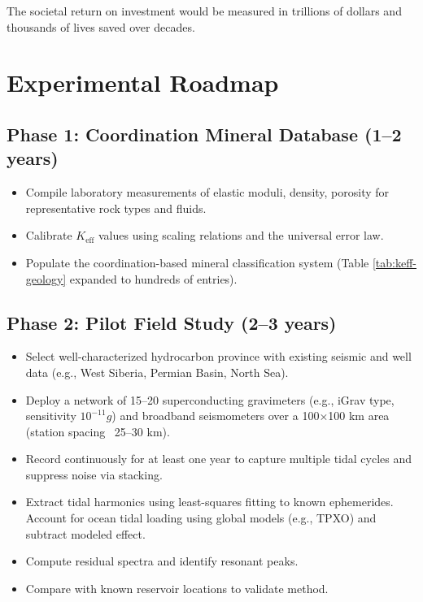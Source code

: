 \documentclass[12pt,a4paper]{article}
\theoremstyle{remark}
\newcommand{\Keff}{K_{\mathrm{eff}}}
\begin{document}
	The societal return on investment would be measured in trillions of dollars and thousands of lives saved over decades.
	
	\section{Experimental Roadmap}
	\label{sec:roadmap}
	
	\subsection{Phase 1: Coordination Mineral Database (1–2 years)}
	
	\begin{itemize}
		\item Compile laboratory measurements of elastic moduli, density, porosity for representative rock types and fluids.
		\item Calibrate $\Keff$ values using scaling relations and the universal error law.
		\item Populate the coordination-based mineral classification system (Table \ref{tab:keff-geology} expanded to hundreds of entries).
	\end{itemize}
	
	\subsection{Phase 2: Pilot Field Study (2–3 years)}
	
	\begin{itemize}
		\item Select well-characterized hydrocarbon province with existing seismic and well data (e.g., West Siberia, Permian Basin, North Sea).
		\item Deploy a network of 15–20 superconducting gravimeters (e.g., iGrav type, sensitivity $10^{-11} g$) and broadband seismometers over a 100×100 km area (station spacing ~25–30 km).
		\item Record continuously for at least one year to capture multiple tidal cycles and suppress noise via stacking.
		\item Extract tidal harmonics using least-squares fitting to known ephemerides. Account for ocean tidal loading using global models (e.g., TPXO) and subtract modeled effect.
		\item Compute residual spectra and identify resonant peaks.
		\item Compare with known reservoir locations to validate method.
	\end{itemize}
	
\end{document}
